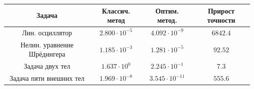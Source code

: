\begin{table}
	\centering
	\vspace{5mm} 
	\renewcommand{\arraystretch}{1.2}
	\begin{tabular}{|c|c|c|c|}
		\hline
		\multicolumn{1}{|c|}{\textbf{Задача}} &
		\textbf{Классич. метод} &
		\textbf{Оптим. метод.} &
		\multicolumn{1}{|c|}{\textbf{Прирост точности}} \\ \hline
		
		Лин. осциллятор &
		$2.800 \cdot 10^{-5}$ &
		$4.092 \cdot 10^{-9}$ &
		$6842.4$ \\ \hline 
		
		Нелин. уравнение Шрёдингера &
		$1.185 \cdot 10^{-3}$ &
		$1.281 \cdot 10^{-5}$ &
		$92.52$ \\ \hline
		
		Задача двух тел &
		$1.637 \cdot 10^{0}$ &
		$2.245 \cdot 10^{-1}$ &
		$7.3$ \\ \hline
		
		Задача пяти внешних тел &
		$1.969 \cdot 10^{-8}$ &
		$3.545 \cdot 10^{-11}$ &
		$555.6$ \\ \hline
	\end{tabular}
	\renewcommand{\arraystretch}{1}
\end{table}